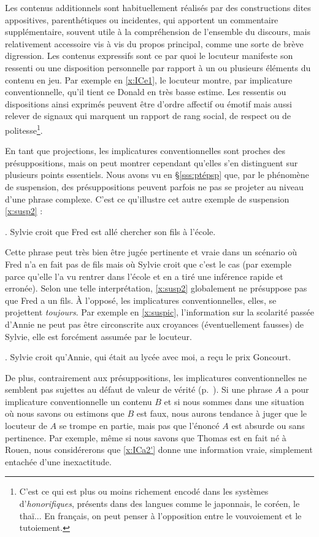 \begin{refsegment}
Les contenus additionnels sont habituellement réalisés par des constructions dites appositives, parenthétiques ou incidentes, qui apportent un commentaire supplémentaire, souvent utile à la compréhension de l'ensemble du discours, mais relativement accessoire vis à vis du propos principal, comme une sorte de brève digression.  Les contenus expressifs sont ce par quoi le locuteur manifeste son ressenti ou une disposition personnelle par rapport à un ou plusieurs éléments du contenu en jeu.  Par exemple en \ref{x:ICe1}, le locuteur montre, par implicature conventionnelle, qu'il tient ce Donald en très basse estime.   Les ressentis ou dispositions ainsi exprimés peuvent être d'ordre affectif ou émotif mais aussi relever de signaux qui marquent un rapport de rang social, de respect ou de politesse\footnote{C'est ce qui est plus ou moins richement encodé dans les systèmes d'\emph{honorifiques}, présents dans des langues comme le japonnais, le coréen, le thaï... En français, on peut penser à l'opposition entre le vouvoiement et le tutoiement.}.




En tant que projections, les implicatures conventionnelles sont proches des présuppositions, mais on peut montrer cependant  qu'elles s'en distinguent sur plusieurs points essentiels.
Nous avons vu en \S\ref{sss:ptépsp} que, par le phénomène de suspension, des présuppositions peuvent parfois ne pas se projeter au niveau d'une phrase complexe. C'est ce qu'illustre cet autre exemple de suspension \ref{x:susp2} :

\ex.
Sylvie croit que Fred est allé chercher son fils à l'école. \label{x:susp2}


Cette phrase peut très bien être jugée pertinente et vraie dans un scénario où Fred n'a en fait pas de fils mais où Sylvie croit que c'est le cas (par exemple parce qu'elle l'a vu rentrer dans l'école et en a tiré une inférence rapide et erronée).  Selon une telle interprétation, \ref{x:susp2} globalement ne présuppose pas que Fred a un fils.  
À l'opposé, les implicatures conventionnelles, elles, se projettent \emph{toujours}.  Par exemple en \ref{x:suspic}, l'information sur la scolarité passée d'Annie ne peut pas être circonscrite aux croyances (éventuellement fausses) de Sylvie, elle est forcément assumée par le locuteur.

\ex.
Sylvie croit qu'Annie, qui était au lycée avec moi, a reçu le prix Goncourt.\label{x:suspic}


\sloppy

De plus, contrairement aux présuppositions, les implicatures conventionnelles ne semblent pas sujettes au défaut de valeur de vérité (p.~\pageref{p.tvgap}).  Si une phrase $A$ a pour implicature conventionnelle un contenu $B$ et si nous sommes dans une situation où nous savons ou estimons que $B$ est faux, nous aurons tendance à juger que le locuteur de $A$ se trompe en partie, mais pas que l'énoncé $A$ est absurde ou sans pertinence.  Par exemple, même si nous savons que Thomas est en fait né à Rouen, nous considérerons que \ref{x:ICa2'} donne une information vraie, simplement entachée d'une inexactitude.


\end{refsegment}
